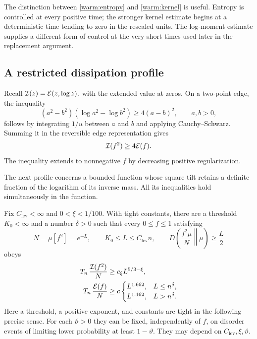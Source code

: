 The distinction between \eqref{warm:entropy} and
\eqref{warm:kernel} is useful.  Entropy is controlled at every positive
time; the stronger kernel estimate begins at a deterministic time tending
to zero in the rescaled units.  The log-moment estimate supplies a
different form of control at the very short times used later in the
replacement argument.

\subsection{A restricted dissipation profile}\label{warm:profile-section}

Recall \(\mathcal I(z)=\mathcal E(z,\log z)\), with the extended value at zeros.  On a
two-point edge, the inequality
\[
 (a^2-b^2)(\log a^2-\log b^2)\ge4(a-b)^2,\qquad a,b>0,
\]
follows by integrating \(1/u\) between \(a\) and \(b\) and applying
Cauchy--Schwarz.  Summing it in the reversible edge representation gives
\begin{equation}
 \mathcal I(f^2)\ge4\mathcal E(f).                                      \label{warm:modified-classical}
\end{equation}
The inequality extends to nonnegative \(f\) by decreasing positive
regularization.

The next profile concerns a bounded function whose square tilt retains
a definite fraction of the logarithm of its inverse mass.  All its
inequalities hold simultaneously in the function.

\begin{proposition}\label{warm:profiles}
Fix \(C_{\mathrm{lev}}<\infty\) and \(0<\xi<1/100\).  With tight constants, there
are a threshold \(K_0<\infty\) and a number \(\delta>0\) such that every
\(0\le f\le1\) satisfying
\begin{equation}
 N=\mu[f^2]=e^{-L},\qquad
 K_0\le L\le C_{\mathrm{lev}} n,\qquad
 D\!\left(\frac{f^2\mu}{N}\middle\Vert\mu\right)\ge\frac L2
                                                               \label{warm:restricted-class}
\end{equation}
obeys
\begin{align}
 T_n\,\frac{\mathcal I(f^2)}{N}&\ge c_\xi L^{5/3-\xi},
                                                               \label{warm:modified-profile}\\
 T_n\,\frac{\mathcal E(f)}{N}&\ge c
 \begin{cases}
 L^{1.662},&L\le n^\delta,\\
 L^{1.162},&L>n^\delta .
 \end{cases}                                                   \label{warm:classical-profile}
\end{align}
Here a threshold, a positive exponent, and constants are tight in the
following precise sense.  For each \(\vartheta>0\) they can be fixed,
independently of \(f\), on disorder events of limiting lower probability
at least \(1-\vartheta\).  They may depend on \(C_{\mathrm{lev}},\xi,\vartheta\).
\end{proposition}

